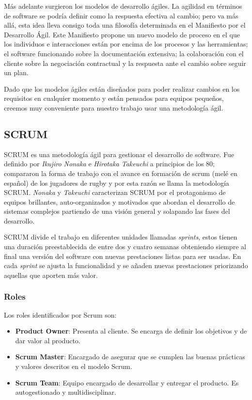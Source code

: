 	Más adelante surgieron los modelos de desarrollo ágiles. 
	La agilidad en términos de software se podría definir como la respuesta efectiva al cambio; pero va más allá, esta idea lleva consigo toda una filosofía determinada en el Manifiesto por el Desarrollo Ágil. Este Manifiesto propone un nuevo modelo de proceso en el que los individuos e interacciones están por encima de los procesos y las herramientas; el software funcionando sobre la documentación extensiva; la colaboración con el cliente sobre la negociación contractual y la respuesta ante el cambio sobre seguir un plan. 

	Dado que los modelos ágiles están diseñados para poder realizar cambios en los requisitos en cualquier momento y están pensados para equipos pequeños, creemos muy conveniente para nuestro trabajo usar una metodología ágil.
	
	\subsection{SCRUM}
	\label{cap2:subsec:SCRUM}
	
	SCRUM es una metodología ágil para gestionar el desarrollo de software. Fue definido por \textit{Ikujiro Nonaka} e \textit{Hirotaka Takeuchi} a principios de los 80; compararon la forma de trabajo con el avance en formación de scrum (melé en español) de los jugadores de rugby y por esta razón se llama la metodología SCRUM. \textit{Nonaka} y \textit{Takeuchi} caracterizan SCRUM por el protagonismo de equipos brillantes, auto-organizados y motivados que abordan el desarrollo de sistemas complejos partiendo de una visión general y solapando las fases del desarrollo.
	
	SCRUM divide el trabajo en diferentes unidades llamadas \textsl{sprints},  estos tienen una duración preestablecida de entre dos y cuatro semanas obteniendo siempre al final una versión del software con nuevas prestaciones listas para ser usadas. En cada \textsl{sprint} se ajusta la funcionalidad y se añaden nuevas prestaciones priorizando aquellas que aporten más valor. 
	
	\subsubsection{Roles}
	
	Los roles identificados por Scrum son:
	
	\begin{itemize}
		\item \textbf{Product Owner}: Presenta al cliente. Se encarga de definir los objetivos y de dar valor al producto.
		\item \textbf{Scrum Master}: Encargado de asegurar que se cumplen las buenas prácticas y valores descritos en el modelo Scrum.
		\item \textbf{Scrum Team}: Equipo encargado de desarrollar y entregar el producto. Es autogestionado y multidisciplinar.
	\end{itemize}
	
